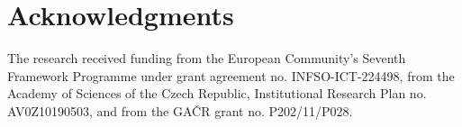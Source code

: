 \documentclass[preprint,1p,times]{elsarticle}
\begin{document}
\section*{Acknowledgments}
  The research received funding from the European Community's Seventh Framework Programme under grant agreement no. INFSO-ICT-224498, from the Academy of Sciences of the Czech Republic, Institutional Research Plan no. AV0Z10190503, and from the GA{\v C}R grant no. P202/11/P028.



\end{document}
